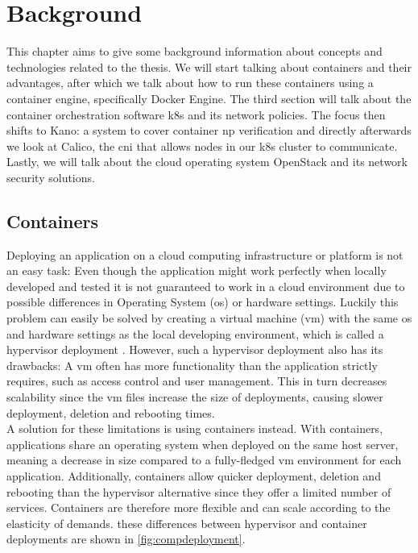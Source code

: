 \chapter{Background}                                 \label{ch:background}
This chapter aims to give some background information about concepts and technologies related to the thesis.
We will start talking about containers and their advantages, after which we talk about how to run these containers using a container engine, specifically Docker Engine. The third section will talk about the container orchestration software \acrshort{k8s} and its network policies. The focus then shifts to Kano: a system to cover container \acrshort{np} verification and directly afterwards we look at Calico, the \acrlong{cni} that allows nodes in our \acrshort{k8s} cluster to communicate. Lastly, we will talk about the cloud operating system OpenStack and its network security solutions.


\section{Containers}
Deploying an application on a cloud computing infrastructure or platform is not an easy task: Even though the application might work perfectly when locally developed and tested it is not guaranteed to work in a cloud environment due to possible differences in Operating System (\acrshort{os}) or hardware settings. Luckily this problem can easily be solved by creating a virtual machine (\acrshort{vm}) with the same \acrshort{os} and hardware settings as the local developing environment, which is called a hypervisor deployment \cite{Bernstein2014}. However, such a hypervisor deployment also has its drawbacks: A \acrshort{vm} often has more functionality than the application strictly requires, such as access control and user management. This in turn decreases scalability since the \acrshort{vm} files increase the size of deployments, causing slower deployment, deletion and rebooting times.
\\[10pt]

A solution for these limitations is using containers instead. With containers, applications share an operating system when deployed on the same host server, meaning a decrease in size compared to a fully-fledged \acrshort{vm} environment for each application. Additionally, containers allow quicker deployment, deletion and rebooting than the hypervisor alternative since they offer a limited number of services. Containers are therefore more flexible and can scale according to the elasticity of demands.  these differences between hypervisor and container deployments are shown in \autoref{fig:compdeployment}. 
\\[10pt]


